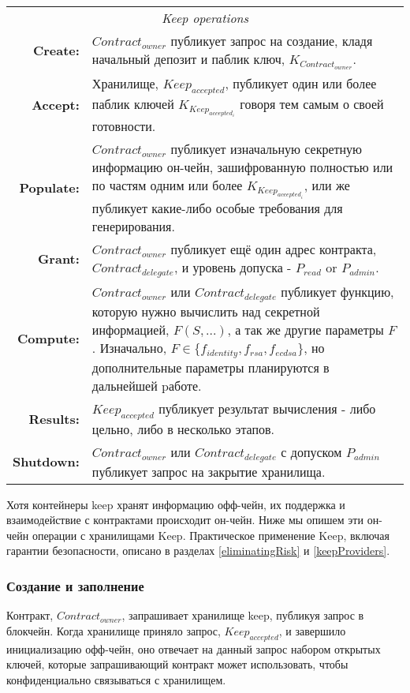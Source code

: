 \documentclass[english,11pt]{article}
\begin{document}
\begin{table*}[t]
  \centering
  \begin{tabular}{|rp{10cm}|}
  \hline
  \multicolumn{2}{|c|}{\textit{Keep operations}} \\
  \textbf{Create:} & $Contract_{owner}$ публикует запрос на создание, 
  кладя начальный депозит и паблик ключ, $K_{Contract_{owner}}$.\\
  \textbf{Accept:} & Хранилище, $Keep_{accepted}$, публикует один 
  или более паблик ключей $K_{Keep_{accepted_i}}$ говоря тем самым 
  о своей готовности.\\
  \textbf{Populate:} & $Contract_{owner}$ публикует изначальную 
  секретную информацию он-чейн, зашифрованную полностью или по частям 
  одним или более $K_{Keep_{accepted_i}}$, или же публикует какие-либо 
  особые требования для генерирования.\\
  \textbf{Grant:} & $Contract_{owner}$ публикует ещё один адрес 
  контракта, $Contract_{delegate}$, и уровень допуска - 
  $P_{read}$ or $P_{admin}$.\\
  \textbf{Compute:} & $Contract_{owner}$ или $Contract_{delegate}$
  публикует функцию, которую нужно вычислить над секретной информацией, 
  $F(S,...)$, а так же другие параметры $F$. Изначально, $F {\in}
  \{f_{identity},f_{rsa},f_{ecdsa}\}$, но дополнительные параметры 
  планируются в дальнейшей pаботе.\\
  \textbf{Results:} & $Keep_{accepted}$ публикует результат 
  вычисления - либо цельно, либо в несколько этапов.\\
  \textbf{Shutdown:} & $Contract_{owner}$ или $Contract_{delegate}$
  с допуском $P_{admin}$ публикует запрос на закрытие хранилища.\\
  \hline
\end{tabular}
\end{table*}

Хотя контейнеры keep хранят информацию офф-чейн, их поддержка и 
взаимодействие с контрактами происходит он-чейн. Ниже мы опишем 
эти он-чейн операции с хранилищами Keep. Практическое применение 
Keep, включая гарантии безопасности, описано в разделах \ref{eliminatingRisk} 
и \ref{keepProviders}.

\subsubsection{Создание и заполнение}

Контракт, $Contract_{owner}$, запрашивает хранилище keep, публикуя запрос 
в блокчейн. Когда хранилище приняло запрос, $Keep_{accepted}$, и завершило 
инициализацию офф-чейн, оно отвечает на данный запрос набором открытых 
ключей, которые запрашивающий контракт может использовать, чтобы 
конфиденциально связываться с хранилищем. 
\end{document}
